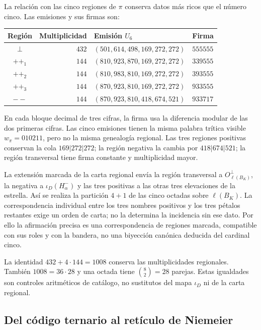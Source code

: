 La relación con las cinco regiones de $\pi$ conserva datos más ricos
que el número cinco. Las emisiones y sus firmas son:
\begin{center}
\small
\begin{tabular}{@{}crll@{}}
\toprule
Región & Multiplicidad & Emisión $U_6$ & Firma \\
\midrule
$\perp$ & $432$ & $(501,614,498,169,272,272)$ & $555555$ \\
$++_1$ & $144$ & $(810,923,870,169,272,272)$ & $339555$ \\
$++_2$ & $144$ & $(810,983,810,169,272,272)$ & $393555$ \\
$++_3$ & $144$ & $(870,923,810,169,272,272)$ & $933555$ \\
$--$ & $144$ & $(870,923,810,418,674,521)$ & $933717$ \\
\bottomrule
\end{tabular}
\end{center}
En cada bloque decimal de tres cifras, la firma usa la diferencia
modular de las dos primeras cifras. Las cinco emisiones tienen la
misma palabra trítica visible $w_\pi=010211$, pero no la misma
genealogía regional. Las tres regiones positivas conservan la cola
$169|272|272$; la región negativa la cambia por $418|674|521$;
la región transversal tiene firma constante y multiplicidad mayor.

La extensión marcada de la carta regional envía la región transversal
a $O_{\ell(B_K)}^\perp$, la negativa a $\iota_D(H^-_\alpha)$ y las
tres positivas a las otras tres elevaciones de la estrella. Así se
realiza la partición $4+1$ de las cinco octadas sobre $\ell(B_K)$.
La correspondencia individual entre los tres nombres positivos y
los tres pétalos restantes exige un orden de carta; no la determina
la incidencia sin ese dato. Por ello la afirmación precisa es una
correspondencia de regiones marcada, compatible con sus roles y con
la bandera, no una biyección canónica deducida del cardinal cinco.

La identidad $432+4\cdot144=1008$ conserva las multiplicidades
regionales. También $1008=36\cdot28$ y una octada tiene
$\binom82=28$ parejas. Estas igualdades son controles aritméticos de
catálogo, no sustitutos del mapa $\iota_D$ ni de la carta regional.



\subsection{Del código ternario al retículo de Niemeier}
\label{exc:niemeier}

